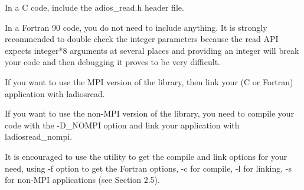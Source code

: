 \vspace{10pt}
In a C code, include the adios\_read.h header file. 

\vspace{10pt}
In a Fortran 90 code, you do not need to include anything. It is strongly recommended 
to double check the integer parameters because the read API expects integer*8 arguments 
at several places and providing an integer will break your code and then debugging 
it proves to be very difficult.

\vspace{10pt}
If you want to use the MPI version of the library, then link your (C or Fortran) 
application with \-{}ladiosread.

\vspace{10pt}
If you want to use the non-MPI version of the library, you need to compile your 
code with the -D\_NOMPI option and link your application with \-{}ladiosread\_nompi.

\vspace{10pt}
It is encouraged to use the utility to get the compile and link options for your 
need, using -f option to get the Fortran options, -c for compile, -l for linking, 
-s for non-MPI applications (see Section 2.5). \label{HToc182553415}
